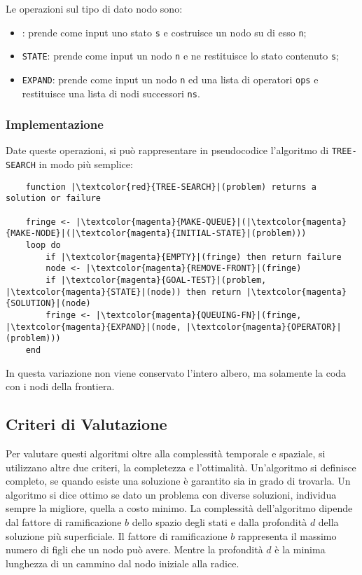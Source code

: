 \documentclass{article}
\numberwithin{equation}{subsection}
\begin{document}
Le operazioni sul tipo di dato nodo sono:
\begin{itemize}
    \item \color{magenta}{\verb|MAKE-NODE|}\color{black}: prende come input uno stato \verb|s| e costruisce un nodo su di esso \verb|n|;
    \item \color{magenta}\verb|STATE|\color{black}: prende come input un nodo \verb|n| e ne restituisce lo stato contenuto \verb|s|;
    \item \color{magenta}\verb|EXPAND|\color{black}: prende come input un nodo \verb|n| ed una lista di operatori \verb|ops| e restituisce una lista di nodi successori \verb|ns|. 
\end{itemize}

\subsubsection{Implementazione}

Date queste operazioni, si può rappresentare in pseudocodice l'algoritmo di \verb|TREE-SEARCH| in modo più 
semplice:
\begin{verbatim}
    function |\textcolor{red}{TREE-SEARCH}|(problem) returns a solution or failure

    fringe <- |\textcolor{magenta}{MAKE-QUEUE}|(|\textcolor{magenta}{MAKE-NODE}|(|\textcolor{magenta}{INITIAL-STATE}|(problem)))
    loop do
        if |\textcolor{magenta}{EMPTY}|(fringe) then return failure
        node <- |\textcolor{magenta}{REMOVE-FRONT}|(fringe)
        if |\textcolor{magenta}{GOAL-TEST}|(problem, |\textcolor{magenta}{STATE}|(node)) then return |\textcolor{magenta}{SOLUTION}|(node)
        fringe <- |\textcolor{magenta}{QUEUING-FN}|(fringe, |\textcolor{magenta}{EXPAND}|(node, |\textcolor{magenta}{OPERATOR}|(problem)))
    end
\end{verbatim}

In questa variazione non viene conservato l'intero albero, ma solamente la coda con i nodi della 
frontiera. 

\subsection{Criteri di Valutazione}

Per valutare questi algoritmi oltre alla complessità temporale e spaziale, si utilizzano 
altre due criteri, la completezza e l'ottimalità. Un'algoritmo si definisce completo, se 
quando esiste una soluzione è garantito sia in grado di trovarla. Un algoritmo si dice 
ottimo se dato un problema con diverse soluzioni, individua sempre la migliore, quella a costo 
minimo. 
La complessità dell'algoritmo dipende dal fattore di ramificazione $b$ dello spazio degli stati e dalla profondità $d$ 
della soluzione più superficiale. Il fattore di ramificazione $b$ rappresenta il massimo numero di 
figli che un nodo può avere. Mentre la profondità $d$ è la minima lunghezza di un cammino dal 
nodo iniziale alla radice. 
\end{document}
